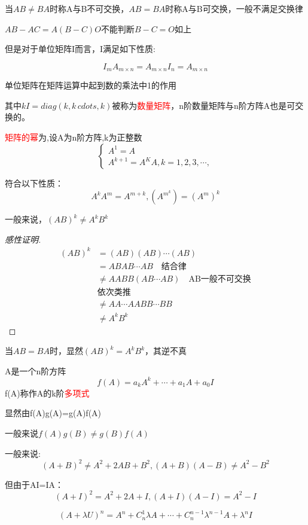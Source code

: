 当$AB\neq BA$时称A与B不可交换，$AB=BA$时称A与B可交换，一般不满足交换律

\begin{note}
	$AB-AC=A(B-C)O$不能判断$B-C=O$如上
\end{note}

但是对于单位矩阵I而言，I满足如下性质:

$$
I_{m}A_{m\times n}=A_{m\times n}I_n=A_{m\times n}
$$

单位矩阵在矩阵运算中起到数的乘法中1的作用

其中$kI=diag(k,k\,cdots,k)$被称为\textcolor{red}{数量矩阵}，n阶数量矩阵与n阶方阵A也是可交换的。

\begin{definition}
	\textcolor{red}{矩阵的幂}为,设A为n阶方阵,k为正整数
	$$
	\begin{cases}
		A^1=A\\
		A^{k+1}=A^KA,k=1,2,3,\cdots,
	\end{cases}
	$$

	符合以下性质：
	$$
	A^kA^m=A^{m+k},(A^{m^k})=(A^m)^k
	$$
\end{definition}

\begin{example}
	一般来说，$(AB)^k\neq A^kB^k$

	\begin{proof}[感性证明]
	$$
	\begin{aligned}
			(AB)^k&=(AB)(AB)\cdots(AB)\\
			&=ABAB\cdots AB\quad \mbox{结合律}\\
			&\neq AABB(AB\cdots AB) \quad \mbox{AB一般不可交换}\\
			&\mbox{依次类推}\\
			&\neq{AA\cdots AABB\cdots BB}\\
			&\neq A^kB^k
	\end{aligned}
	$$
	\end{proof}

	当$AB=BA$时，显然$(AB)^k= A^kB^k$，其逆不真
\end{example}

\begin{definition}
	A是一个n阶方阵
	$$
	f(A)=a_kA^k+\cdots+a_1A+a_0I
	$$
	f(A)称作A的k阶\textcolor{red}{多项式}

	显然由f(A)g(A)=g(A)f(A)

	一般来说$f(A)g(B)\neq g(B)f(A)$

	一般来说:
	$$
	(A+B)^2\neq A^2+2AB+B^2
	,(A+B)(A-B)\neq A^2-B^2
	$$

	但由于AI=IA：
	$$
	(A+I)^2= A^2+2A+I
	,(A+I)(A-I)= A^2-I
	$$

	$$(A+\lambda U)^n=A^n+C_n^1\lambda A+\cdots+C_n^{n-1}\lambda^{n-1}A+\lambda^n I$$
\end{definition}

